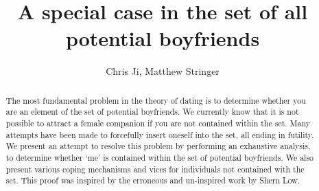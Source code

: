 \documentclass[11pt]{extarticle}
\title{A special case in the set of all potential boyfriends}
\author{Chris Ji, Matthew Stringer}
\theoremstyle{definition}
\begin{document}
\maketitle
\begin{abstract}
The most fundamental problem in the theory of dating is to determine whether you are an element of the set of potential boyfriends. We currently know that it is not possible to attract a female companion if you are not contained within the set. Many attempts have been made to forcefully insert oneself into the set, all ending in futility. We present an attempt to resolve this problem by performing an exhaustive analysis, to determine whether ‘me’ is contained within the set of potential boyfriends. We also present various coping mechanisms and vices for individuals not contained with the set. This proof was inspired by the erroneous and un-inspired work by Shern Low. 
\end{abstract}
\end{document}
